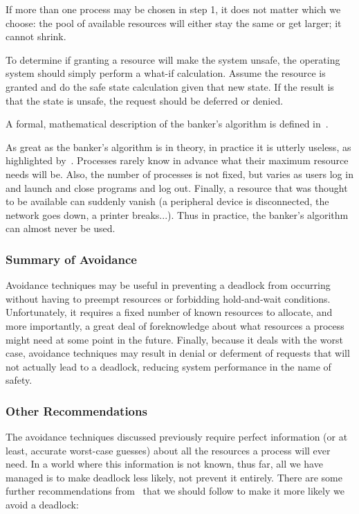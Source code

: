 If more than one process may be chosen in step 1, it does not matter which we choose: the pool of available resources will either stay the same or get larger; it cannot shrink. 

To determine if granting a resource will make the system unsafe, the operating system should simply perform a what-if calculation. Assume the resource is granted and do the safe state calculation given that new state. If the result is that the state is unsafe, the request should be deferred or denied.

A formal, mathematical description of the banker's algorithm is defined in~\cite{osc}.

As great as the banker's algorithm is in theory, in practice it is utterly useless, as highlighted by~\cite{mos}. Processes rarely know in advance what their maximum resource needs will be. Also, the number of processes is not fixed, but varies as users log in and launch and close programs and log out. Finally, a resource that was thought to be available can suddenly vanish (a peripheral device is disconnected, the network goes down, a printer breaks...). Thus in practice, the banker's algorithm can almost never be used.


\subsubsection*{Summary of Avoidance}

Avoidance techniques may be useful in preventing a deadlock from occurring without having to preempt resources or forbidding hold-and-wait conditions. Unfortunately, it requires a fixed number of known resources to allocate, and more importantly, a great deal of foreknowledge about what resources a process might need at some point in the future. Finally, because it deals with the worst case, avoidance techniques may result in denial or deferment of requests that will not actually lead to a deadlock, reducing system performance in the name of safety.

\subsubsection*{Other Recommendations}

The avoidance techniques discussed previously require perfect information (or at least, accurate worst-case guesses) about all the resources a process will ever need. In a world where this information is not known, thus far, all we have managed is to make deadlock less likely, not prevent it entirely. There are some further recommendations from~\cite{rtsda} that we should follow to make it more likely we avoid a deadlock:

